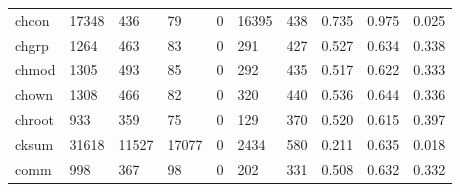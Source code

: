 \begin{longtable}{lp{2.0cm}p{2.0cm}p{2.0cm}p{2.0cm}p{2.0cm}p{2.0cm}p{2.0cm}p{2.0cm}p{2.0cm}}
chcon     &                  17348 &                                436 &                                79 &                                0 &                             16395 &                             438 &                                   0.735 &                                  0.975 &                                0.025 \\
chgrp     &                   1264 &                                463 &                                83 &                                0 &                               291 &                             427 &                                   0.527 &                                  0.634 &                                0.338 \\
chmod     &                   1305 &                                493 &                                85 &                                0 &                               292 &                             435 &                                   0.517 &                                  0.622 &                                0.333 \\
chown     &                   1308 &                                466 &                                82 &                                0 &                               320 &                             440 &                                   0.536 &                                  0.644 &                                0.336 \\
chroot    &                    933 &                                359 &                                75 &                                0 &                               129 &                             370 &                                   0.520 &                                  0.615 &                                0.397 \\
cksum     &                  31618 &                              11527 &                             17077 &                                0 &                              2434 &                             580 &                                   0.211 &                                  0.635 &                                0.018 \\
comm      &                    998 &                                367 &                                98 &                                0 &                               202 &                             331 &                                   0.508 &                                  0.632 &                                0.332 \\

\end{longtable}
